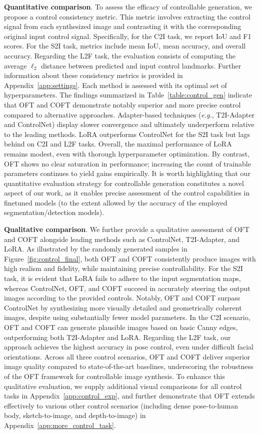 \textbf{Quantitative comparison}. To assess the efficacy of controllable generation, we propose a control consistency metric. This metric involves extracting the control signal from each synthesized image and contrasting it with the corresponding original input control signal. Specifically, for the C2I task, we report IoU and F1 scores. For the S2I task, metrics include mean IoU, mean accuracy, and overall accuracy. Regarding the L2F task, the evaluation consists of computing the average $\ell_2$ distance between predicted and input control landmarks. Further information about these consistency metrics is provided in Appendix~\ref{app:settings}. Each method is assessed with its optimal set of hyperparameters. The findings summarized in Table~\ref{table:control_gen} indicate that OFT and COFT demonstrate notably superior and more precise control compared to alternative approaches. Adapter-based techniques (\emph{e.g.}, T2I-Adapter and ControlNet) display slower convergence and ultimately underperform relative to the leading methods. LoRA outperforms ControlNet for the S2I task but lags behind on C2I and L2F tasks. Overall, the maximal performance of LoRA remains modest, even with thorough hyperparameter optimization. By contrast, OFT shows no clear saturation in performance; increasing the count of trainable parameters continues to yield gains empirically. It is worth highlighting that our quantitative evaluation strategy for controllable generation constitutes a novel aspect of our work, as it enables precise assessment of the control capabilities in finetuned models (to the extent allowed by the accuracy of the employed segmentation/detection models).

\textbf{Qualitative comparison}. We further provide a qualitative assessment of OFT and COFT alongside leading methods such as ControlNet, T2I-Adapter, and LoRA. As illustrated by the randomly generated samples in Figure~\ref{fig:control_final}, both OFT and COFT consistently produce images with high realism and fidelity, while maintaining precise controllability. For the S2I task, it is evident that LoRA fails to adhere to the input segmentation maps, whereas ControlNet, OFT, and COFT succeed in accurately steering the output images according to the provided controls. Notably, OFT and COFT surpass ControlNet by synthesizing more visually detailed and geometrically coherent images, despite using substantially fewer model parameters. In the C2I scenario, OFT and COFT can generate plausible images based on basic Canny edges, outperforming both T2I-Adapter and LoRA. Regarding the L2F task, our approach achieves the highest accuracy in pose control, even under difficult facial orientations. Across all three control scenarios, OFT and COFT deliver superior image quality compared to state-of-the-art baselines, underscoring the robustness of the OFT framework for controllable image synthesis. To enhance this qualitative evaluation, we supply additional visual comparisons for all control tasks in Appendix~\ref{app:control_exp}, and further demonstrate that OFT extends effectively to various other control scenarios (including dense pose-to-human body, sketch-to-image, and depth-to-image) in Appendix~\ref{app:more_control_task}.

